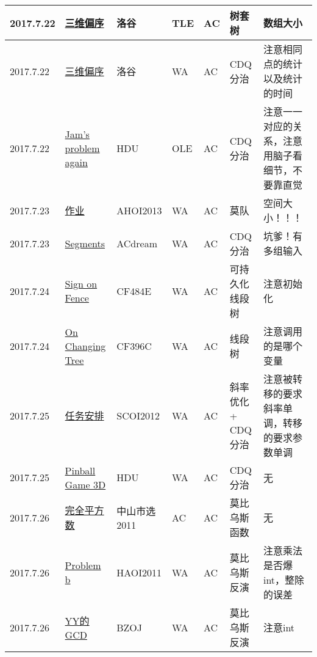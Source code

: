 \documentclass[a4paper]{article}
\begin{document}
\begin{longtable}{|p{1.5cm}|p{2.5cm}|p{1.6cm}|p{1.6cm}|p{1cm}|p{3cm}|p{4cm}|}
		\hline
		2017.7.22 & \href {https://www.luogu.org/problem/show?pid=3810#sub}{三维偏序}
		 & 洛谷 & TLE & AC & 树套树 & 数组大小\\
		
		\hline
		2017.7.22 & \href {https://www.luogu.org/problem/show?pid=3810#sub}{三维偏序}
		 & 洛谷 & WA & AC & CDQ分治 & 注意相同点的统计以及统计的时间\\
		
		\hline
		2017.7.22 & \href {https://vjudge.net/problem/HDU-5618}{Jam's problem again}
		 & HDU & OLE & AC & CDQ分治 & 注意一一对应的关系，注意用脑子看细节，不要靠直觉\\
		
		\hline
		2017.7.23 & \href {http://www.lydsy.com/JudgeOnline/problem.php?id=3236}{作业}
		 & AHOI2013 & WA & AC & 莫队 & 空间大小！！！\\
		
		\hline
		2017.7.23 & \href {https://vjudge.net/problem/ACdream-1157}{Segments}
		 & ACdream & WA & AC & CDQ分治 & 坑爹！有多组输入\\
		
		\hline
		2017.7.24 & \href {http://codeforces.com/problemset/problem/484/E}{Sign on Fence}
		 & CF484E & WA & AC & 可持久化线段树 & 注意初始化\\
		
		\hline
		2017.7.24 & \href {http://codeforces.com/problemset/problem/396/C}{On Changing Tree}
		 & CF396C & WA & AC & 线段树 & 注意调用的是哪个变量\\
		
		\hline
		2017.7.25 & \href {http://www.lydsy.com/JudgeOnline/problem.php?id=2726}{任务安排}
		 & SCOI2012 & WA & AC & 斜率优化 + CDQ分治 & 注意被转移的要求斜率单调，转移的要求参数单调\\
		
		\hline
		2017.7.25 & \href {https://vjudge.net/problem/HDU-4742}{Pinball Game 3D}
		 & HDU & WA & AC & CDQ分治 & 无\\
		
		\hline
		2017.7.26 & \href {http://www.lydsy.com/JudgeOnline/problem.php?id=2440}{完全平方数}
		 & 中山市选2011 & AC & AC & 莫比乌斯函数 & 无\\
		
		\hline
		2017.7.26 & \href {http://www.lydsy.com/JudgeOnline/problem.php?id=2301}{Problem b}
		 & HAOI2011 & WA & AC & 莫比乌斯反演 & 注意乘法是否爆int，整除的误差\\
		
		\hline
		2017.7.26 & \href {http://www.lydsy.com/JudgeOnline/problem.php?id=2820}{YY的GCD}
		 & BZOJ & WA & AC & 莫比乌斯反演 & 注意int\\
		

\end{longtable}
\end{document}
